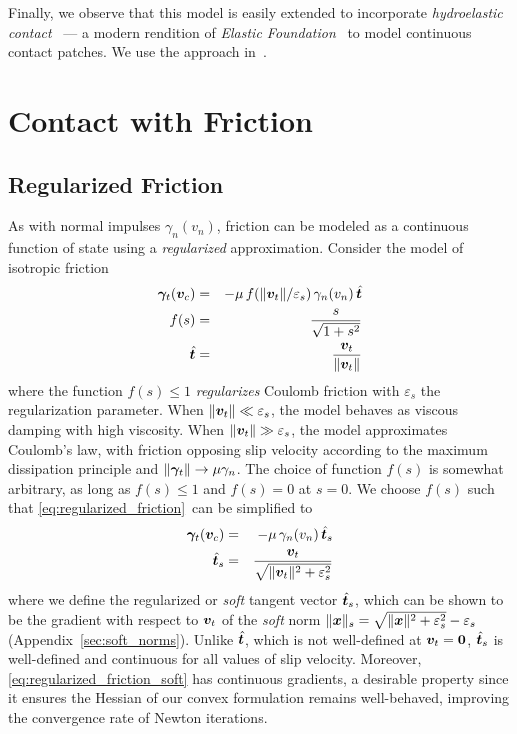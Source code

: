 Finally, we observe that this model is easily extended to incorporate
\emph{hydroelastic contact}~\cite{bib:elandt2019pressure} --- a modern rendition
of \emph{Elastic Foundation}~\cite[\S 4.3]{bib:johnson1987_contact_mechanics} to
model continuous contact patches. We use the approach
in~\cite{bib:masterjohn2021discrete}.

\section{Contact with Friction}

\subsection{Regularized Friction}
\label{sec:regularized_friction}

As with normal impulses $\gamma_n(v_n)$, friction can be
modeled as a continuous function of state using a \emph{regularized}
approximation. Consider the model of isotropic friction
\begin{eqnarray}
    \bgamma_t(\vf{v}_c) &=&
    -\mu\,f(\Vert\vf{v}_t\Vert/\varepsilon_s)\,\gamma_n(v_n)\,\hat{\vf{t}}\nonumber\\
    f(s) &=& \frac{s}{\sqrt{1+s^2}}
    \label{eq:regularized_friction}\\
    \hat{\vf{t}} &=& \frac{\vf{v}_t}{\Vert\vf{v}_t\Vert}\nonumber
\end{eqnarray}
where the function $f(s)\le 1$ \emph{regularizes} Coulomb friction with
$\varepsilon_s$ the regularization parameter. When
$\Vert{\bm{v}}_t\Vert\ll\varepsilon_s$, the model behaves as viscous damping with
high viscosity. When $\Vert{\bm{v}}_t\Vert \gg \varepsilon_s$, the model
approximates Coulomb's law, with friction opposing slip velocity according to
the maximum dissipation principle and $\Vert{\bm\gamma}_t\Vert \rightarrow
\mu\gamma_n$. The choice of function $f(s)$ is somewhat arbitrary, as long as
$f(s) \le 1$ and $f(s)=0$ at $s=0$. We choose $f(s)$ such that
\eqref{eq:regularized_friction}~can be simplified to
\begin{eqnarray}
    \bgamma_t(\vf{v}_c) &=& -\mu\,\gamma_n(v_n)\,\hat{\vf{t}}_s\nonumber\\
    \hat{\vf{t}}_s &=&
    \frac{\vf{v}_t}{\sqrt{\Vert\vf{v}_t\Vert^2+\varepsilon_s^2}}
    \label{eq:regularized_friction_soft}
\end{eqnarray}
where we define the regularized or \emph{soft}
tangent vector $\hat{{\bm{t}}}_s$, which can be shown to be the gradient with
respect to ${\bm{v}}_t$ of the \emph{soft} norm
$\Vert{\bm{x}}\Vert_s=\sqrt{\Vert{\bm{x}}\Vert^2+\varepsilon_s^2} - \varepsilon_s$
(Appendix~\ref{sec:soft_norms}). Unlike $\hat{{\bm{t}}}$, which is not
well-defined at ${\bm{v}}_t={\bm{0}}$, $\hat{{\bm{t}}}_s$ is well-defined and continuous
for all values of slip velocity. Moreover, \eqref{eq:regularized_friction_soft}
has continuous gradients, a  desirable property since it ensures the Hessian of
our convex formulation remains well-behaved, improving the convergence rate of
Newton iterations.

